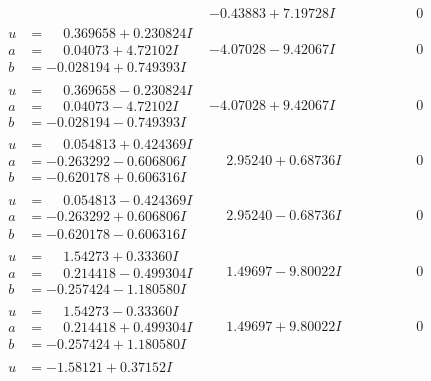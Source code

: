 \documentclass[1p]{elsarticle_modified}
\theoremstyle{definition}
\begin{document}
$$\begin{array}{c|c|c}
 & -0.43883 + 7.19728 I & \phantom{-0.000000 } 0 \\ \hline\begin{aligned}
u &= \phantom{-}0.369658 + 0.230824 I \\
a &= \phantom{-}0.04073 + 4.72102 I \\
b &= -0.028194 + 0.749393 I\end{aligned}
 & -4.07028 - 9.42067 I & \phantom{-0.000000 } 0 \\ \hline\begin{aligned}
u &= \phantom{-}0.369658 - 0.230824 I \\
a &= \phantom{-}0.04073 - 4.72102 I \\
b &= -0.028194 - 0.749393 I\end{aligned}
 & -4.07028 + 9.42067 I & \phantom{-0.000000 } 0 \\ \hline\begin{aligned}
u &= \phantom{-}0.054813 + 0.424369 I \\
a &= -0.263292 - 0.606806 I \\
b &= -0.620178 + 0.606316 I\end{aligned}
 & \phantom{-}2.95240 + 0.68736 I & \phantom{-0.000000 } 0 \\ \hline\begin{aligned}
u &= \phantom{-}0.054813 - 0.424369 I \\
a &= -0.263292 + 0.606806 I \\
b &= -0.620178 - 0.606316 I\end{aligned}
 & \phantom{-}2.95240 - 0.68736 I & \phantom{-0.000000 } 0 \\ \hline\begin{aligned}
u &= \phantom{-}1.54273 + 0.33360 I \\
a &= \phantom{-}0.214418 - 0.499304 I \\
b &= -0.257424 - 1.180580 I\end{aligned}
 & \phantom{-}1.49697 - 9.80022 I & \phantom{-0.000000 } 0 \\ \hline\begin{aligned}
u &= \phantom{-}1.54273 - 0.33360 I \\
a &= \phantom{-}0.214418 + 0.499304 I \\
b &= -0.257424 + 1.180580 I\end{aligned}
 & \phantom{-}1.49697 + 9.80022 I & \phantom{-0.000000 } 0 \\ \hline\begin{aligned}
u &= -1.58121 + 0.37152 I \\

\end{aligned}
\end{array}$$
\end{document}
